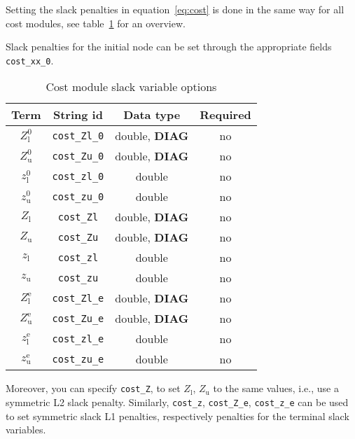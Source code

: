 \documentclass[english]{article}
\newcommand{\code}[1]{\texttt{#1}}
\newcommand{\ind}[1]{_{\textrm{#1}}}
\newcommand{\terminal}{^{\textrm{e}}}
\newcommand{\initial}{^{\textrm{0}}}
\newcommand{\Lower}{\ind{l}}
\newcommand{\upper}{\ind{u}}
\newcommand{\optional}{no}
\begin{document}
Setting the slack penalties in equation~\eqref{eq:cost} is done in the same way for all cost modules, see table~\ref{tab:cost:slack} for an overview.

Slack penalties for the initial node can be set through the appropriate fields \code{cost\_xx\_0}.
%
\begin{table}[ht!]
    \centering
    \caption{Cost module slack variable options} \label{tab:cost:slack}
    \begin{tabular}{cccc}
        \toprule
        Term  & String id & Data type & Required \\ \midrule
        $ Z\Lower\initial $ & \code{cost\_Zl\_0} & double, \textbf{DIAG} & \optional   \\
        $ Z\upper\initial $ & \code{cost\_Zu\_0} & double, \textbf{DIAG} & \optional   \\
        $ z\Lower\initial $ & \code{cost\_zl\_0} & double  & \optional   \\
        $ z\upper\initial $ & \code{cost\_zu\_0} & double  & \optional   \\ [1em]
        $ Z\Lower $          & \code{cost\_Zl}    & double, \textbf{DIAG}  & \optional \\
        $ Z\upper $          & \code{cost\_Zu}    & double, \textbf{DIAG}  & \optional   \\
        $ z\Lower $          & \code{cost\_zl}    & double  & \optional   \\
        $ z\upper $          & \code{cost\_zu}    & double  & \optional   \\ [1em]
        $ Z\Lower\terminal $ & \code{cost\_Zl\_e} & double, \textbf{DIAG} & \optional   \\
        $ Z\upper\terminal $ & \code{cost\_Zu\_e} & double, \textbf{DIAG} & \optional   \\
        $ z\Lower\terminal $ & \code{cost\_zl\_e} & double  & \optional   \\
        $ z\upper\terminal $ & \code{cost\_zu\_e} & double  & \optional   \\
        \bottomrule
    \end{tabular}
\end{table}

Moreover, you can specify \code{cost\_Z}, to set $ Z\Lower$, $Z\upper$ to the same values, i.e., use a symmetric L2 slack penalty.
Similarly, \code{cost\_z}, \code{cost\_Z\_e}, \code{cost\_z\_e} can be used to set symmetric slack L1 penalties, respectively penalties for the terminal slack variables.
\end{document}
